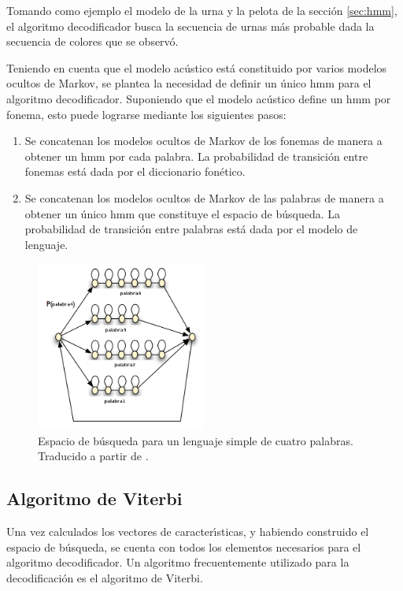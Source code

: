 Tomando como ejemplo el modelo de la urna y la pelota de la secci\'on \ref{sec:hmm}, el algoritmo decodificador
busca la secuencia de urnas m\'as probable dada la secuencia de colores que se observ\'o.

Teniendo en cuenta que el modelo ac\'ustico est\'a constituido por varios modelos ocultos de Markov, se plantea
la necesidad de definir un \'unico \gls{hmm} para el algoritmo decodificador. Suponiendo que el modelo ac\'ustico
define un \gls{hmm} por fonema, esto puede lograrse mediante los siguientes pasos:

\begin{enumerate}
	\item Se concatenan los modelos ocultos de Markov de los fonemas de manera a obtener un \gls{hmm} 
	por cada palabra. 
	La probabilidad de transici\'on entre fonemas est\'a dada por el diccionario fon\'etico.
	\item Se concatenan los modelos ocultos de Markov de las palabras de manera a obtener un \'unico \gls{hmm} que
	constituye el espacio de b\'usqueda. La probabilidad de transici\'on entre palabras est\'a dada por el modelo
	de lenguaje.
\end{enumerate}

\begin{figure}[H] 
\centering
\includegraphics[width=0.5\textwidth]{./graphics/espacio.png}
\caption{Espacio de b\'usqueda para un lenguaje simple de cuatro palabras. Traducido a partir de \cite{RenalsSearch}.}
\label{figure:espacio-busqueda}
\end{figure}



\subsection{Algoritmo de Viterbi}
Una vez calculados los vectores de caracter{\'\i}sticas, y habiendo construido el espacio de b\'usqueda, 
se cuenta con todos los elementos necesarios para el algoritmo decodificador. Un algoritmo frecuentemente 
utilizado para la decodificaci\'on es el algoritmo de Viterbi.

